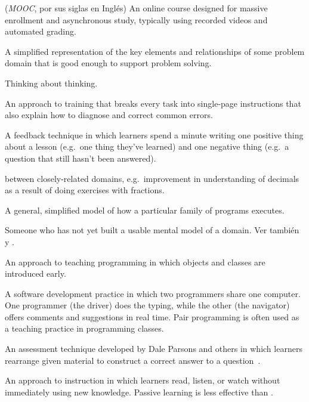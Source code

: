 \begin{description}
 (\emph{MOOC}, por sus siglas en Inglés) An online course designed
for massive enrollment and asynchronous study, typically using recorded videos
and automated grading.

 A simplified representation of the key
elements and relationships of some problem domain that is good enough to support
problem solving.

 Thinking about thinking.

 An approach to training that breaks
every task into single-page instructions that also explain how to diagnose and
correct common errors.

 A feedback technique in which learners
spend a minute writing one positive thing about a lesson (e.g.\ one thing
they've learned) and one negative thing (e.g.\ a question that still hasn't been
answered).

 
between closely-related domains, e.g.\ improvement in understanding of decimals
as a result of doing exercises with fractions.

 A general, simplified model of how
a particular family of programs executes.

 Someone who has not yet built a usable mental model of
a domain. Ver también 
y .

 An approach to teaching programming in
which objects and classes are introduced early.

 A software development practice in
which two programmers share one computer. One programmer (the driver) does the
typing, while the other (the navigator) offers comments and suggestions in real
time. Pair programming is often used as a teaching practice in programming
classes.

 An assessment technique developed by
Dale Parsons and others in which learners rearrange given material to construct
a correct answer to a question~\cite{Pars2006}.

 An approach to instruction in which
learners read, listen, or watch without immediately using new knowledge.
Passive learning is less effective than .


\end{description}
